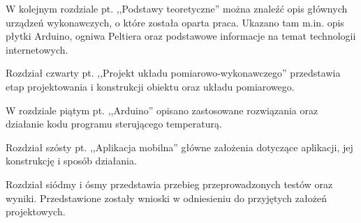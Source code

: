 W kolejnym rozdziale pt. ,,Podstawy teoretyczne'' można znaleźć opis głównych urządzeń wykonawczych, o które została oparta praca. Ukazano tam m.in. opis płytki Arduino, ogniwa Peltiera oraz podstawowe informacje na temat technologii internetowych.

Rozdział czwarty pt. ,,Projekt układu pomiarowo-wykonawczego'' przedstawia etap projektowania i konstrukcji obiektu oraz układu pomiarowego.

W rozdziale piątym pt. ,,Arduino'' opisano zastosowane rozwiązania oraz działanie kodu programu sterującego temperaturą.

Rozdział szósty pt. ,,Aplikacja mobilna'' główne założenia dotyczące aplikacji, jej konstrukcję i sposób działania.

Rozdział siódmy i ósmy przedstawia przebieg przeprowadzonych testów oraz wyniki. Przedstawione zostały wnioski w odniesieniu do przyjętych założeń projektowych.